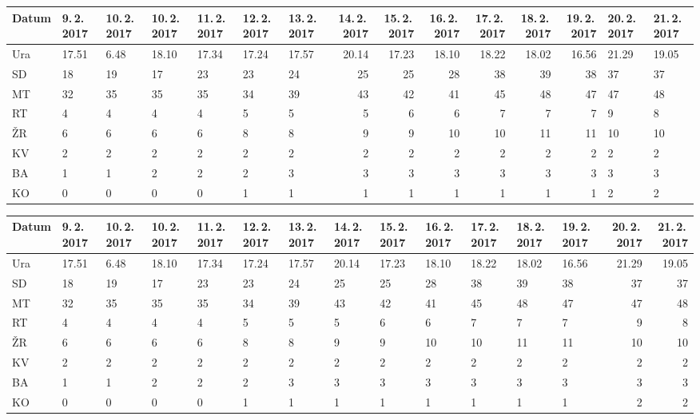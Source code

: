 \documentclass[12pt, a4paper, oneside]{report}
\begin{document}
\begin{table}
\begin{minipage}{\textwidth}
    \begin{tabular}{|HHHHHHHr|r|r|r|r|rHH|}
      \hline \hline
      Datum & 9.\,2.\,2017 & 10.\,2.\,2017 & 10.\,2.\,2017 & 11.\,2.\,2017 & 12.\,2.\,2017 & 13.\,2.\,2017 & 14.\,2.\,2017 & 15.\,2.\,2017 & 16.\,2.\,2017 & 17.\,2.\,2017 & 18.\,2.\,2017 & 19.\,2.\,2017 & 20.\,2.\,2017 & 21.\,2.\,2017 \\ \hline
      Ura & 17.51	& 6.48	& 18.10	& 17.34	& 17.24	& 17.57	& 20.14	& 17.23	& 18.10	& 18.22	& 18.02	& 16.56	& 21.29	& 19.05 \\ \hline \hline
      SD & 18 & 19 & 17 & 23 & 23 & 24 & 25 & 25 & 28 & 38 & 39 & 38 & 37 & 37 \\ \hline
      MT & 32 & 35 & 35 & 35 & 34 & 39 & 43 & 42 & 41 & 45 & 48 & 47 & 47 & 48 \\ \hline
      RT & 4 & 4 & 4 & 4 & 5 & 5 & 5 & 6 & 6 & 7 & 7 & 7 & 9 & 8 \\ \hline
      ŽR & 6 & 6 & 6 & 6 & 8 & 8 & 9 & 9 & 10 & 10 & 11 & 11 & 10 & 10 \\ \hline
      KV & 2 & 2 & 2 & 2 & 2 & 2 & 2 & 2 & 2 & 2 & 2 & 2 & 2 & 2 \\ \hline
      BA & 1 & 1 & 2 & 2 & 2 & 3 & 3 & 3 & 3 & 3 & 3 & 3 & 3 & 3 \\ \hline
      KO & 0 & 0 & 0 & 0 & 1 & 1 & 1 & 1 & 1 & 1 & 1 & 1 & 2 & 2 \\ \hline \hline
    \end{tabular}

    \vspace{0.3cm}

    \begin{tabular}{|HHHHHHHHHHHHHr|r||}
      \hline \hline
      Datum & 9.\,2.\,2017 & 10.\,2.\,2017 & 10.\,2.\,2017 & 11.\,2.\,2017 & 12.\,2.\,2017 & 13.\,2.\,2017 & 14.\,2.\,2017 & 15.\,2.\,2017 & 16.\,2.\,2017 & 17.\,2.\,2017 & 18.\,2.\,2017 & 19.\,2.\,2017 & 20.\,2.\,2017 & 21.\,2.\,2017 \\ \hline
      Ura & 17.51	& 6.48	& 18.10	& 17.34	& 17.24	& 17.57	& 20.14	& 17.23	& 18.10	& 18.22	& 18.02	& 16.56	& 21.29	& 19.05 \\ \hline \hline
      SD & 18 & 19 & 17 & 23 & 23 & 24 & 25 & 25 & 28 & 38 & 39 & 38 & 37 & 37 \\ \hline
      MT & 32 & 35 & 35 & 35 & 34 & 39 & 43 & 42 & 41 & 45 & 48 & 47 & 47 & 48 \\ \hline
      RT & 4 & 4 & 4 & 4 & 5 & 5 & 5 & 6 & 6 & 7 & 7 & 7 & 9 & 8 \\ \hline
      ŽR & 6 & 6 & 6 & 6 & 8 & 8 & 9 & 9 & 10 & 10 & 11 & 11 & 10 & 10 \\ \hline
      KV & 2 & 2 & 2 & 2 & 2 & 2 & 2 & 2 & 2 & 2 & 2 & 2 & 2 & 2 \\ \hline
      BA & 1 & 1 & 2 & 2 & 2 & 3 & 3 & 3 & 3 & 3 & 3 & 3 & 3 & 3 \\ \hline
      KO & 0 & 0 & 0 & 0 & 1 & 1 & 1 & 1 & 1 & 1 & 1 & 1 & 2 & 2 \\ \hline \hline
    \end{tabular}
  \end{minipage}
\end{table}
\end{document}
